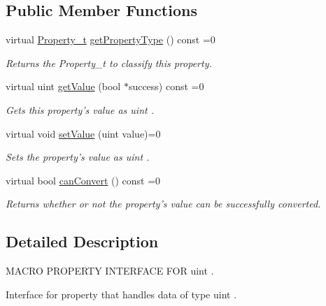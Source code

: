 \subsection*{Public Member Functions}
\begin{DoxyCompactItemize}
\item 
virtual \hyperlink{group___property_classes_ga38f1ccddda12c7cb50b868c9f789ee37}{Property\-\_\-t} \hyperlink{class_i_u_int_property_a64bce0a1e93666424d3252e78216fa33}{get\-Property\-Type} () const =0
\begin{DoxyCompactList}\small\item\em Returns the Property\-\_\-t to classify this property. \end{DoxyCompactList}\item 
virtual uint \hyperlink{class_i_u_int_property_af3c17d292a74241f1d80b10be434edde}{get\-Value} (bool $\ast$success) const =0
\begin{DoxyCompactList}\small\item\em Gets this property's value as uint . \end{DoxyCompactList}\item 
virtual void \hyperlink{class_i_u_int_property_a2344d640892a4c3529bcca63c4c2531c}{set\-Value} (uint value)=0
\begin{DoxyCompactList}\small\item\em Sets the property's value as uint . \end{DoxyCompactList}\item 
virtual bool \hyperlink{class_i_u_int_property_a4fa6fa9ef5663109772bf51123323c87}{can\-Convert} () const =0
\begin{DoxyCompactList}\small\item\em Returns whether or not the property's value can be successfully converted. \end{DoxyCompactList}\end{DoxyCompactItemize}


\subsection{Detailed Description}
M\-A\-C\-R\-O P\-R\-O\-P\-E\-R\-T\-Y I\-N\-T\-E\-R\-F\-A\-C\-E F\-O\-R uint . 

Interface for property that handles data of type uint . 

